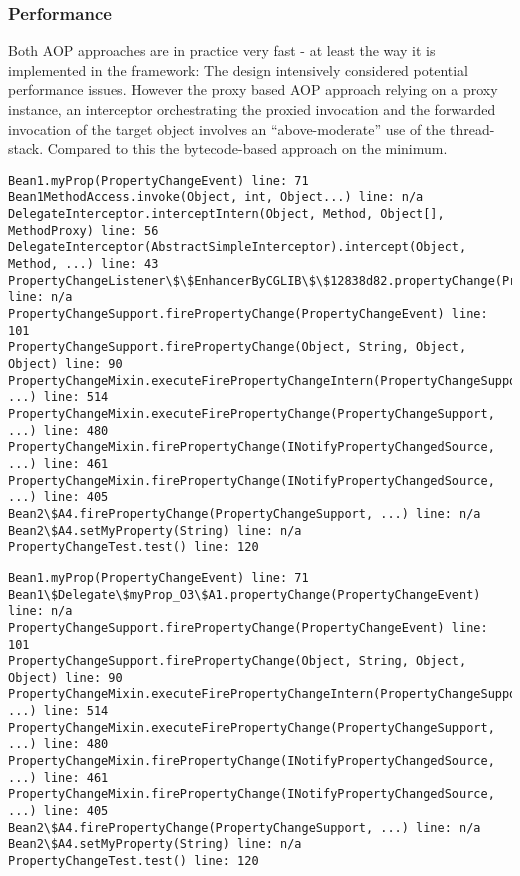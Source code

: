 \subsubsection{Performance}
Both AOP approaches are in practice very fast - at least the way it is implemented in the \AMBETH{} framework: The design intensively considered potential performance issues. However the proxy based AOP approach relying on a proxy instance, an interceptor orchestrating the proxied invocation and the forwarded invocation of the target object involves an ``above-moderate'' use of the thread-stack. Compared to this the bytecode-based approach on the minimum.

\begin{lstlisting}[style=Java,caption={Example stack trace of a proxy based invocation}]
Bean1.myProp(PropertyChangeEvent) line: 71	
Bean1MethodAccess.invoke(Object, int, Object...) line: n/a
DelegateInterceptor.interceptIntern(Object, Method, Object[], MethodProxy) line: 56	
DelegateInterceptor(AbstractSimpleInterceptor).intercept(Object, Method, ...) line: 43	
PropertyChangeListener\$\$EnhancerByCGLIB\$\$12838d82.propertyChange(PropertyChangeEvent) line: n/a
PropertyChangeSupport.firePropertyChange(PropertyChangeEvent) line: 101	
PropertyChangeSupport.firePropertyChange(Object, String, Object, Object) line: 90	
PropertyChangeMixin.executeFirePropertyChangeIntern(PropertyChangeSupport, ...) line: 514	
PropertyChangeMixin.executeFirePropertyChange(PropertyChangeSupport, ...) line: 480	
PropertyChangeMixin.firePropertyChange(INotifyPropertyChangedSource, ...) line: 461	
PropertyChangeMixin.firePropertyChange(INotifyPropertyChangedSource, ...) line: 405	
Bean2\$A4.firePropertyChange(PropertyChangeSupport, ...) line: n/a
Bean2\$A4.setMyProperty(String) line: n/a
PropertyChangeTest.test() line: 120
\end{lstlisting}

\begin{lstlisting}[style=Java,caption={Example stack trace of a bytecode based invocation}]
Bean1.myProp(PropertyChangeEvent) line: 71	
Bean1\$Delegate\$myProp_O3\$A1.propertyChange(PropertyChangeEvent) line: n/a
PropertyChangeSupport.firePropertyChange(PropertyChangeEvent) line: 101	
PropertyChangeSupport.firePropertyChange(Object, String, Object, Object) line: 90	
PropertyChangeMixin.executeFirePropertyChangeIntern(PropertyChangeSupport, ...) line: 514	
PropertyChangeMixin.executeFirePropertyChange(PropertyChangeSupport, ...) line: 480	
PropertyChangeMixin.firePropertyChange(INotifyPropertyChangedSource, ...) line: 461	
PropertyChangeMixin.firePropertyChange(INotifyPropertyChangedSource, ...) line: 405	
Bean2\$A4.firePropertyChange(PropertyChangeSupport, ...) line: n/a
Bean2\$A4.setMyProperty(String) line: n/a
PropertyChangeTest.test() line: 120	
\end{lstlisting}

